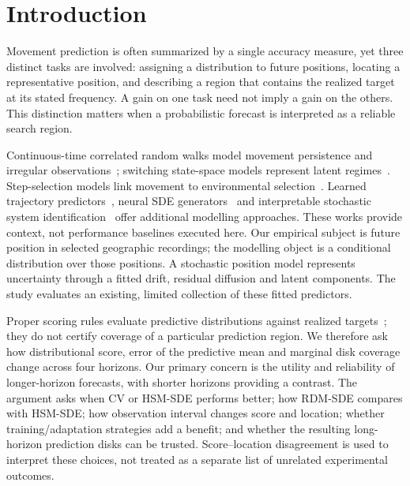 \section{Introduction}\label{sec:introduction}\hypertarget{sec:introduction}{}
Movement prediction is often summarized by a single accuracy measure, yet
three distinct tasks are involved: assigning a distribution to future
positions, locating a representative position, and describing a region
that contains the realized target at its stated frequency. A gain on one
task need not imply a gain on the others. This distinction matters when a
probabilistic forecast is interpreted as a reliable search region.

Continuous-time correlated random walks model movement persistence and
irregular observations~\cite{johnson2008}; switching state-space models
represent latent regimes~\cite{ghahramani2000}. Step-selection models link
movement to environmental selection~\cite{avgar2016,avgar2017correction}.
Learned trajectory predictors~\cite{gupta2018,salzmann2020}, neural SDE
generators~\cite{kidger2021} and interpretable stochastic system
identification~\cite{gao2024} offer additional modelling approaches.
These works provide context, not performance baselines executed here.
Our empirical subject is future position in selected geographic recordings;
the modelling object is a conditional distribution over those positions.
A stochastic position model represents uncertainty through a fitted drift,
residual diffusion and latent components. The study evaluates an existing,
limited collection of these fitted predictors.

Proper scoring rules evaluate predictive distributions against realized
targets~\cite{gneiting2007,gneiting2008}; they do not certify coverage of
a particular prediction region. We therefore ask how distributional
score, error of the predictive mean and marginal disk coverage change
across four horizons. Our primary concern is the utility and reliability
of longer-horizon forecasts, with shorter horizons providing a contrast.
The argument asks when CV or HSM-SDE performs better; how RDM-SDE compares
with HSM-SDE; how observation interval changes score and location;
whether training/adaptation strategies add a benefit; and whether
the resulting long-horizon prediction disks can be trusted. Score--location
disagreement is used to interpret these choices, not treated as a separate
list of unrelated experimental outcomes.


